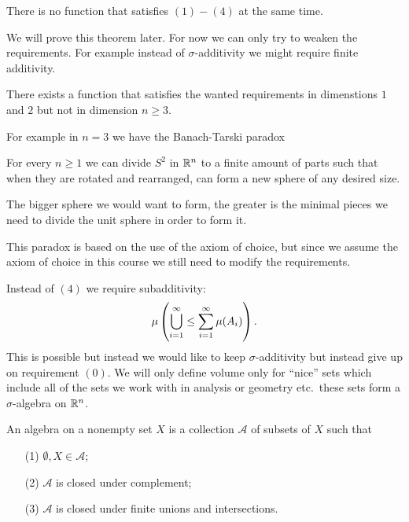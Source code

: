 \documentclass[11pt,a4paper]{article}
\begin{document}
\begin{theorem}[Hausdorrf, 1914]
  There is no function that satisfies $(1) - (4)$ at the same time.
\end{theorem}

We will prove this theorem later.
For now we can only try to weaken the requirements.
For example instead of $\sigma$-additivity we might require finite
additivity.

\begin{theorem}
  There exists a function that satisfies the wanted requirements in
  dimenstions $1$ and $2$ but not in dimension $n \geq 3$.
\end{theorem}

For example in $n = 3$ we have the Banach-Tarski paradox

\begin{paradox}
  For every $n \geq 1$ we can divide $S^2$ in $\mathbb{R}^n$ to a finite amount 
  of parts such that when they are rotated and rearranged,
  can form a new sphere of any desired size.
\end{paradox}
\begin{remark}
  The bigger sphere we would want to form, the greater is the minimal
  pieces we need to divide the unit sphere in order to form it.
\end{remark}

This paradox is based on the use of the axiom of choice, but since we
assume the axiom of choice in this course we still need to modify the
requirements.

Instead of $(4)$ we require subadditivity:
\[
  \mu\del{\bigcup_{i=1}^{\infty} \le \sum_{i=1}^{\infty} \mu(A_i)}.
\]
This is possible but instead we would like to keep $\sigma$-additivity
but instead give up on requirement $(0)$.
We will only define volume only for ``nice'' sets which include
all of the sets we work with in analysis or geometry etc.\ these
sets form a $\sigma$-algebra on $\mathbb{R}^n$.

\begin{definition}[Algebra]
  An algebra on a nonempty set $X$ is a collection $\mathcal A$ of
  subsets of $X$ such that
  \begin{enumerate}
    \item[(1)] $\emptyset, X \in \mathcal A$;
    \item[(2)] $\mathcal A$ is closed under complement;
    \item[(3)] $\mathcal A$ is closed under finite unions and intersections.
  \end{enumerate}
\end{definition}
\end{document}
